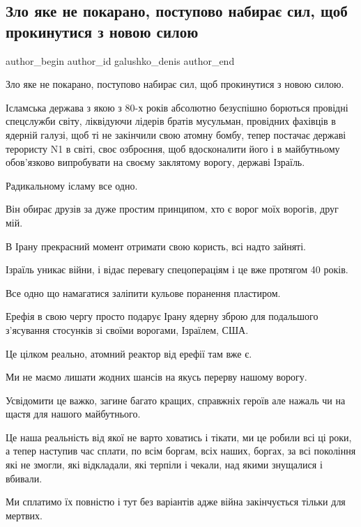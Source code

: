  
 
 
 
 

\subsection{Зло яке не покарано, поступово набирає сил, щоб прокинутися з новою силою}
\label{sec:19_10_2022.fb.galushko_denis.1.zlo_yake_ne_pokarano}

\ifcmt
 author_begin
   author_id galushko_denis
 author_end
\fi

Зло яке не покарано, поступово набирає сил, щоб прокинутися з новою силою.

Ісламська держава з якою з 80-х років абсолютно безуспішно борються провідні
спецслужби світу, ліквідуючи лідерів братів мусульман, провідних фахівців в
ядерній галузі, щоб ті не закінчили свою атомну бомбу,  тепер постачає державі
терористу N1 в світі, своє озброєння, щоб  вдосконалити його і в майбутньому
обов'язково випробувати на своєму заклятому ворогу, державі Ізраїль.

Радикальному ісламу все одно.

Він обирає друзів за дуже простим принципом, хто є ворог моїх ворогів, друг
мій.  

В Ірану  прекрасний момент отримати свою користь, всі надто зайняті.  

Ізраїль уникає війни, і відає перевагу спецопераціям і це вже протягом 40
років.

Все одно що намагатися заліпити кульове поранення пластиром. 

Ерефія в свою чергу просто подарує Ірану ядерну зброю для подальшого з'ясування
стосунків зі своїми ворогами, Ізраїлем, США.

Це цілком реально, атомний реактор від ерефії там вже є. 

Ми не маємо лишати жодних шансів на якусь перерву нашому ворогу.

Усвідомити це важко, загине багато кращих, справжніх героїв але нажаль чи на
щастя для нашого майбутнього.

Це наша реальність від якої не варто ховатись і тікати, ми це робили всі ці
роки, а тепер наступив час сплати, по всім боргам, всіх наших, боргах, за всі
покоління які не змогли, які відкладали, які терпіли і чекали, над якими
знущалися і вбивали.

Ми сплатимо їх повністю і тут без варіантів адже війна закінчується тільки для
мертвих.
